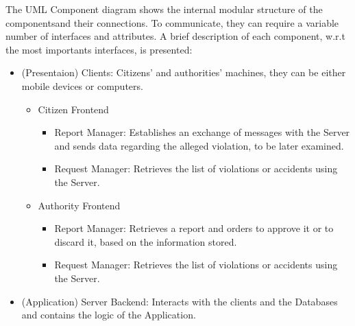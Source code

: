     The UML Component diagram shows the internal modular structure of the componentsand their connections. 
    To communicate, they can require a variable number of interfaces and attributes. 
    A brief description of each component, w.r.t the most importants interfaces, is presented:

    \begin{itemize}

        \item (Presentaion) Clients: Citizens' and authorities' machines, they can be either mobile devices or computers.
        
        \begin{itemize}

            \item Citizen Frontend

            \begin{itemize}

                \item Report Manager: Establishes an exchange of messages with the Server and sends data regarding the alleged violation, to be later examined.
                
                \item Request Manager: Retrieves the list of violations or accidents using the Server.
                
            \end{itemize}

            \item Authority Frontend

            \begin{itemize}

                \item Report Manager: Retrieves a report and orders to approve it or to discard it, based on the information stored.
                
                \item Request Manager: Retrieves the list of violations or accidents using the Server.
                
            \end{itemize}
            
        \end{itemize}

        \item (Application) Server Backend: Interacts with the clients and the Databases and contains the logic of the Application.
        

\end{itemize}
